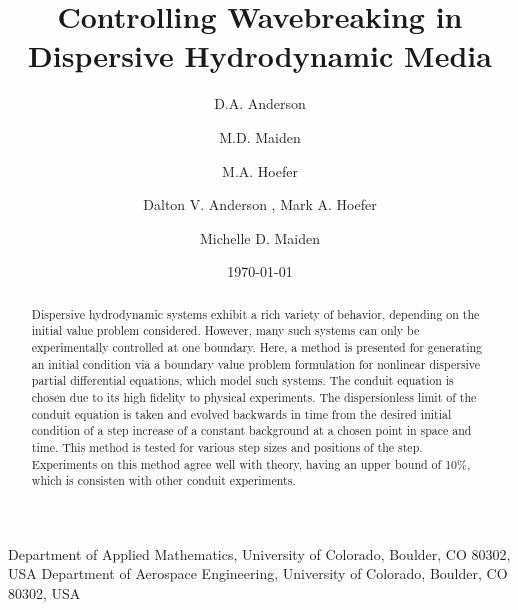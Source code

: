 \documentclass{jfm}
\title{Controlling Wavebreaking in Dispersive Hydrodynamic Media}
\author{D.A. Anderson}
\author{M.D. Maiden}
\author{M.A. Hoefer}
\affiliation{Department of Applied Mathematics, University of Colorado, Boulder, Colorado 80309, USA}
\date{\today}
\begin{document}

\author
 {
 Dalton V. Anderson
  ,
  Mark A. Hoefer 
  \and 
  Michelle D. Maiden
  }

\affiliation
{
Department of Applied Mathematics, University of Colorado, Boulder, CO 80302, USA
Department of Aerospace Engineering, University of Colorado, Boulder, CO 80302, USA
}

\maketitle

\begin{abstract}
Dispersive hydrodynamic systems exhibit a rich variety of behavior, depending on the initial value problem considered. However, many such systems can only be experimentally controlled at one boundary. Here, a method is presented for generating an initial condition via a boundary value problem formulation for nonlinear dispersive partial differential equations, which model such systems. The conduit equation is chosen due to its high fidelity to physical experiments. The dispersionless limit of the conduit equation is taken and evolved backwards in time from the desired initial condition of a step increase of a constant background at a chosen point in space and time. This method is tested for various step sizes and positions of the step. Experiments on this method agree well with theory, having an upper bound of 10\%, which is consisten with other conduit experiments.
\end{abstract}
\end{document}

